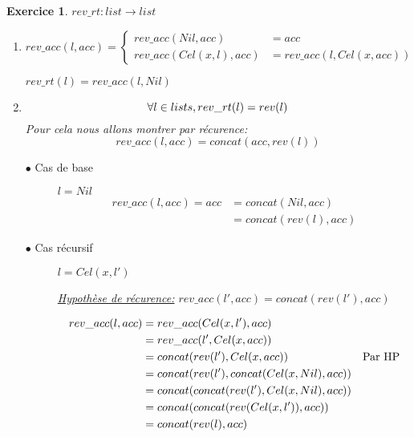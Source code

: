 \documentclass{article}
\theoremstyle{plain}
\newtheorem{exo}{Exercice}%
\begin{document}
\begin{exo} $rev\_rt : list \rightarrow list$
\begin{enumerate}
\item 
        \[ rev\_acc (l, acc) =
        \begin{cases}
        rev\_acc(Nil, acc) &= acc \\
        rev\_acc(Cel(x, l), acc) &= rev\_acc(l, Cel(x, acc)) 
        \end{cases}
        \]
        \begin{center}
            $rev\_rt(l) = rev\_acc(l, Nil)$                
        \end{center}

\item
    \begin{equation*}
        \forall l \in lists,rev\_rt(l) = rev(l) \\
    \end{equation*}
    Pour cela nous allons montrer par récurence:
    \begin{equation*}          
        rev\_acc(l, acc) = concat(acc, rev(l))
    \end{equation*}
    \begin{description}
    \item[$\bullet$ Cas de base] $l = Nil$
        \begin{align*} 
            rev\_acc(l, acc) = acc &= concat(Nil, acc) \\
                                    &= concat(rev(l), acc)
        \end{align*}
    \item[$\bullet$ Cas récursif] $l = Cel(x, l')$ 
                
        \underline{Hypothèse de récurence:} 
        $rev\_acc(l', acc) = concat(rev(l') ,acc)$
                
        \begin{align*}
            rev\_acc(l, acc) &= rev\_acc(Cel(x, l'), acc) \\
                            &= rev\_acc(l', Cel(x, acc)) \\
                            &= concat(rev(l'), Cel(x, acc)) & \textmd{Par HP} \\
                            &= concat(rev(l'), concat(Cel(x, Nil), acc)) \\
                            &= concat(concat(rev(l'), Cel(x, Nil), acc)) \\
                            &= concat(concat(rev(Cel(x, l')), acc)) \\
                            &= concat(rev(l), acc)
        \end{align*}
    \end{description}
\end{enumerate}
\end{exo}
\end{document}
